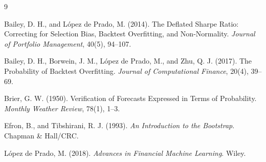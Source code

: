 \documentclass[11pt]{article}
\begin{document}
\begin{thebibliography}{9}
\thispagestyle{fancy}

Bailey, D. H., and L{\'o}pez de Prado, M. (2014).
The Deflated Sharpe Ratio: Correcting for Selection Bias, Backtest Overfitting, and
Non-Normality. \emph{Journal of Portfolio Management}, 40(5), 94--107.

Bailey, D. H., Borwein, J. M., L{\'o}pez de Prado, M., and Zhu, Q. J. (2017).
The Probability of Backtest Overfitting. \emph{Journal of Computational Finance},
20(4), 39--69.

Brier, G. W. (1950).
Verification of Forecasts Expressed in Terms of Probability.
\emph{Monthly Weather Review}, 78(1), 1--3.

Efron, B., and Tibshirani, R. J. (1993).
\emph{An Introduction to the Bootstrap}. Chapman \& Hall/CRC.

L{\'o}pez de Prado, M. (2018).
\emph{Advances in Financial Machine Learning}. Wiley.

\end{thebibliography}
\end{document}
